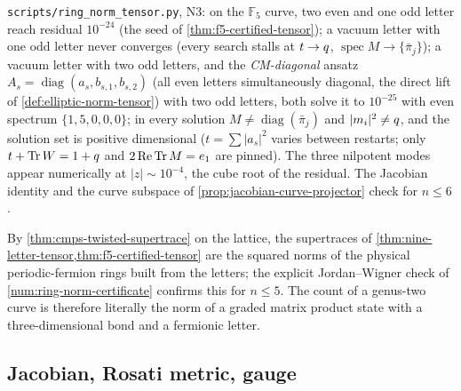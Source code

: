 \begin{numerical}
\label{num:genus-two-cm-diagonal}
\texttt{scripts/ring\_norm\_tensor.py}, N3: on the $\mathbb F_5$ curve, two even and one odd letter
reach residual $10^{-24}$ (the seed of \cref{thm:f5-certified-tensor}); a vacuum letter with one
odd letter never converges (every search stalls at $t\to q$, $\operatorname{spec}M\to\{\bar\pi_j\}$);
a vacuum letter with two odd letters, and the \emph{CM-diagonal} ansatz
$A_s = \operatorname{diag}(a_s,b_{s,1},b_{s,2})$ (all even letters simultaneously diagonal, the direct
lift of \cref{def:elliptic-norm-tensor}) with two odd letters, both solve it to $10^{-25}$ with
even spectrum $\{1,5,0,0,0\}$; in every solution $M\ne\operatorname{diag}(\bar\pi_j)$ and
$|m_i|^2\ne q$, and the solution set is positive dimensional ($t = \sum|a_s|^2$ varies between
restarts; only $t+\operatorname{Tr} W = 1+q$ and $2\operatorname{Re}\operatorname{Tr} M = e_1$ are pinned). The three nilpotent
modes appear numerically at $|z|\sim10^{-4}$, the cube root of the residual. The Jacobian
identity and the curve subspace of \cref{prop:jacobian-curve-projector} check for $n\le6$.
\end{numerical}

\begin{corollary}
\label{cor:genus-two-physical-norm}
By \cref{thm:cmps-twisted-supertrace} on the lattice, the supertraces of
\cref{thm:nine-letter-tensor,thm:f5-certified-tensor} are the squared norms of the physical
periodic-fermion rings built from the letters; the explicit Jordan--Wigner check of
\cref{num:ring-norm-certificate} confirms this for $n\le5$. The count of a genus-two curve is
therefore literally the norm of a graded matrix product state with a three-dimensional bond
and a fermionic letter.
\end{corollary}

\subsection{Jacobian, Rosati metric, gauge}

